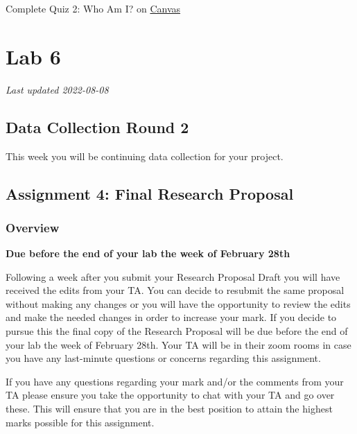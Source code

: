 \documentclass[
]{book}
\begin{document}
Complete Quiz 2: Who Am I? on \href{https://canvas.ubc.ca/courses/113910}{Canvas}

\hypertarget{part-lab-6}{%
\part*{Lab 6}\label{part-lab-6}}

\emph{Last updated 2022-08-08}

\hypertarget{data-collection-round-2}{%
\chapter*{Data Collection Round 2}\label{data-collection-round-2}}

This week you will be continuing data collection for your project.

\hypertarget{assignment-4-final-research-proposal}{%
\chapter*{Assignment 4: Final Research Proposal}\label{assignment-4-final-research-proposal}}

\hypertarget{overview-1}{%
\section*{Overview}\label{overview-1}}

\textbf{Due before the end of your lab the week of February 28th}

Following a week after you submit your Research Proposal Draft you will have received the edits from your TA. You can decide to resubmit the same proposal without making any changes or you will have the opportunity to review the edits and make the needed changes in order to increase your mark. If you decide to pursue this the final copy of the Research Proposal will be due before the end of your lab the week of February 28th. Your TA will be in their zoom rooms in case you have any last-minute questions or concerns regarding this assignment.

If you have any questions regarding your mark and/or the comments from your TA please ensure you take the opportunity to chat with your TA and go over these. This will ensure that you are in the best position to attain the highest marks possible for this assignment.
\end{document}
